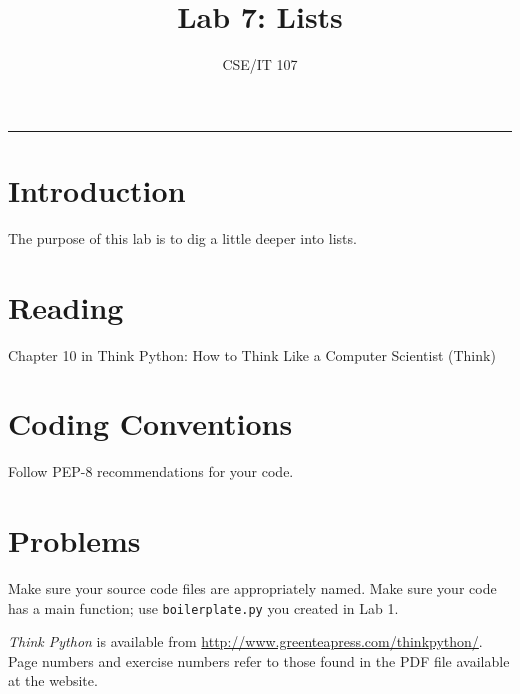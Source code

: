 \documentclass[12pt]{article}
\title{Lab 7: Lists}
\author{CSE/IT 107}
\date{}
\begin{document}
\maketitle


\hrule
\section*{Introduction}

The purpose of this lab is to dig a little deeper into lists.

\section*{Reading}

Chapter 10 in Think Python: How to Think Like a Computer Scientist (Think)

\section*{Coding Conventions}

Follow PEP-8 recommendations for your code. 

\section*{Problems}

Make sure your source code files are appropriately named. Make sure your code has a main function; use \texttt{boilerplate.py} you created in Lab 1.

\emph{Think Python} is available from \url{http://www.greenteapress.com/thinkpython/}. Page numbers and exercise numbers refer to those found in the PDF file available at the website.
\end{document}
